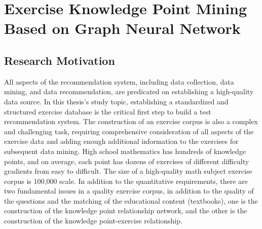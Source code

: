 
\chapter{Exercise Knowledge Point Mining Based on Graph Neural Network}

\ifpdf
    \graphicspath{{Chapter2/Figs/Raster/}{Chapter2/Figs/PDF/}{Chapter2/Figs/}}
\else
    \graphicspath{{Chapter2/Figs/Vector/}{Chapter2/Figs/PDF/}{Chapter2/Figs/}}
\fi


\section{Research Motivation}

All aspects of the recommendation system, including data collection, data mining, and data recommendation, are predicated on establishing a high-quality data source. In this thesis's study topic, establishing a standardized and structured exercise database is the critical first step to build a test recommendation system. The construction of an exercise corpus is also a complex and challenging task, requiring comprehensive consideration of all aspects of the exercise data and adding enough additional information to the exercises for subsequent data mining. High school mathematics has hundreds of knowledge points, and on average, each point has dozens of exercises of different difficulty gradients from easy to difficult. The size of a high-quality math subject exercise corpus is 100,000 scale. In addition to the quantitative requirements, there are two fundamental issues in a quality exercise corpus, in addition to the quality of the questions and the matching of the educational content (textbooks), one is the construction of the knowledge point relationship network, and the other is the construction of the knowledge point-exercise relationship.

